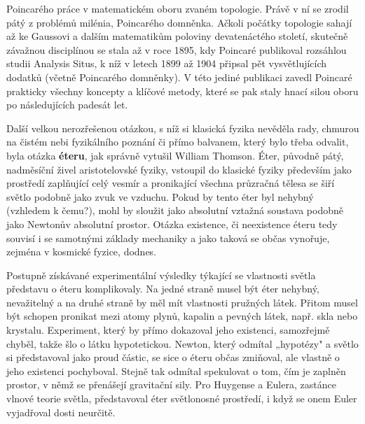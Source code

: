 \begin{tcnote}
        Poincarého práce v matematickém oboru zvaném topologie. Právě v ní se zrodil pátý z problémů
        milénia, Poincarého domněnka. Ačkoli počátky topologie sahají až ke Gaussovi a dalším
        matematikům poloviny devatenáctého století, skutečně závažnou disciplínou se stala až v roce
        1895, kdy Poincaré publikoval rozsáhlou studii Analysis Situs, k níž v letech 1899 až 1904
        připsal pět vysvětlujících dodatků (včetně Poincarého domněnky). V této jediné publikaci
        zavedl Poincaré prakticky všechny koncepty a klíčové metody, které se pak staly hnací silou
        oboru po následujících padesát let.
      \end{tcnote}

      Další velkou nerozřešenou otázkou, s níž si klasická fyzika nevěděla rady, chmurou na čistém
      nebi fyzikálního poznání či přímo balvanem, který bylo třeba odvalit, byla otázka
      \textbf{éteru}, jak správně vytušil William Thomson. Éter, původně pátý, nadměsíční živel
      aristotelovské fyziky, vstoupil do klasické fyziky především jako prostředí zaplňující celý
      vesmír a pronikající všechna průzračná tělesa se šiří světlo podobně jako zvuk ve vzduchu.
      Pokud by tento éter byl nehybný (vzhledem k čemu?), mohl by sloužit jako absolutní vztažná
      soustava podobně jako Newtonův absolutní prostor. Otázka existence, či neexistence éteru tedy
      souvisí i se samotnými základy mechaniky a jako taková se občas vynořuje, zejména v kosmické
      fyzice, dodnes.

      Postupně získávané experimentální výsledky týkající se vlastnosti světla představu o éteru
      komplikovaly. Na jedné straně musel být éter nehybný, nevažitelný a na druhé straně by měl mít
      vlastnosti pružných látek. Přitom musel být schopen pronikat mezi atomy plynů, kapalin a
      pevných látek, např. skla nebo krystalu. Experiment, který by přímo dokazoval jeho existenci,
      samozřejmě chyběl, takže šlo o látku hypotetickou. Newton, který odmítal „hypotézy" a světlo
      si představoval jako proud částic, se sice o éteru občas zmiňoval, ale vlastně o jeho
      existenci pochyboval. Stejně tak odmítal spekulovat o tom, čím je zaplněn prostor, v němž se
      přenášejí gravitační sily. Pro Huygense a Eulera, zastánce vlnové teorie světla, představoval
      éter světlonosné prostředí, i když se onem Euler vyjadřoval dosti neurčitě. 

